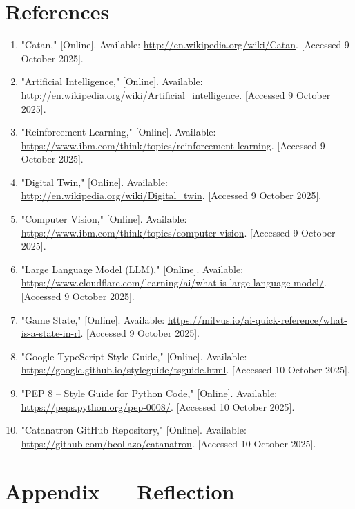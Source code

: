 \documentclass{article}
\begin{document}
\section*{References}
\begin{enumerate}
    \item "Catan," [Online]. Available: \url{http://en.wikipedia.org/wiki/Catan}. [Accessed 9 October 2025].
    \item "Artificial Intelligence," [Online]. Available: \url{http://en.wikipedia.org/wiki/Artificial_intelligence}. [Accessed 9 October 2025].
    \item "Reinforcement Learning," [Online]. Available: \url{https://www.ibm.com/think/topics/reinforcement-learning}. [Accessed 9 October 2025].
    \item "Digital Twin," [Online]. Available: \url{http://en.wikipedia.org/wiki/Digital_twin}. [Accessed 9 October 2025].
    \item "Computer Vision," [Online]. Available: \url{https://www.ibm.com/think/topics/computer-vision}. [Accessed 9 October 2025].
    \item "Large Language Model (LLM)," [Online]. Available: \url{https://www.cloudflare.com/learning/ai/what-is-large-language-model/}. [Accessed 9 October 2025].
    \item "Game State," [Online]. Available: \url{https://milvus.io/ai-quick-reference/what-is-a-state-in-rl}. [Accessed 9 October 2025].
    \item "Google TypeScript Style Guide," [Online]. Available: \url{https://google.github.io/styleguide/tsguide.html}. [Accessed 10 October 2025].
    \item "PEP 8 -- Style Guide for Python Code," [Online]. Available: \url{https://peps.python.org/pep-0008/}. [Accessed 10 October 2025].
    \item "Catanatron GitHub Repository," [Online]. Available: \url{https://github.com/bcollazo/catanatron}. [Accessed 10 October 2025].
\end{enumerate}
\newpage{}

\section*{Appendix --- Reflection}

\end{document}
